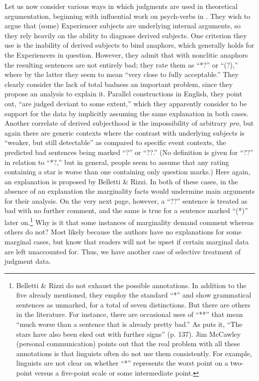 \noindent Let us now consider various ways in which judgments are used in theoretical argumentation, beginning with  influential work on psych-verbs in . They wish to argue that (some) Experiencer subjects are underlying internal arguments, so they rely heavily on the ability to diagnose derived subjects. One criterion they use is the inability of derived subjects to bind anaphors, which generally holds for the Experiencers in question. However, they admit that with nonclitic anaphors the resulting sentences are not entirely bad; they rate them as ``*?'' or ``(?),'' where by the latter they seem to mean ``very close to fully acceptable.'' They clearly consider the lack of total badness an important problem, since they propose an analysis to explain it. Parallel constructions in English, they point out, ``are judged deviant to some extent,'' which they apparently consider to be support for the  data by implicitly assuming the same explanation in both cases. Another correlate of derived subjecthood is the impossibility of arbitrary \textit{pro}, but again there are generic contexts where the contrast with underlying subjects is ``weaker, but still detectable'' as compared to specific event contexts, the predicted bad sentences being marked ``?'' or ``??.'' (No definition is given for ``??'' in relation to ``*?,'' but in general, people seem to assume that any rating containing a star is worse than one containing only question marks.) Here again, an explanation is proposed by Belletti \& Rizzi. In both of these cases, in the absence of an explanation the marginality facts would undermine main arguments for their analysis. On the very next page, however, a ``??'' sentence is treated as bad with no further comment, and the same is true for a
sentence marked ``(*)'' later on.\footnote{Belletti \& Rizzi do not exhaust the possible annotations. In addition to the five already mentioned, they employ the standard ``*'' and show grammatical sentences as unmarked, for a total of seven distinctions. But there are others in the literature. For instance, there are occasional uses of ``**'' that mean ``much worse than a sentence that is already pretty bad.'' As \citet{Hagege1981} puts it, ``The stars have also been eked out with further signs'' (p. 137). Jim McCawley (personal communication) points out that the real problem with all these annotations is that linguists often do not use them consistently. For example, linguists are not clear on whether ``*'' represents the worst point on a two-point versus a five-point scale or some intermediate point.}
 Why is it that some instances of marginality demand comment whereas others do not? Most likely because the authors have no explanations for some marginal cases, but know that readers will not be upset if certain marginal data are left unaccounted for. Thus, we have another case of selective treatment of judgment  data.

